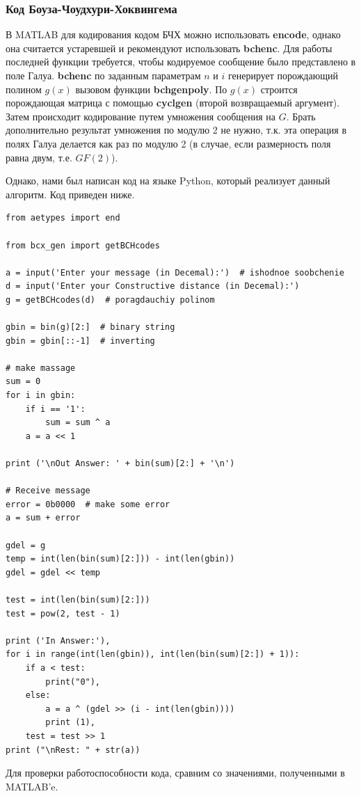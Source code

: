 \documentclass[12pt,a4paper]{article}
\begin{document}
\subsubsection{Код Боуза-Чоудхури-Хоквингема}
  
  В MATLAB для кодирования кодом БЧХ можно использовать \textbf{encode}, однако она считается устаревшей и рекомендуют использовать \textbf{bchenc}. Для работы последней функции требуется, чтобы кодируемое сообщение было представлено в поле Галуа.
  \textbf{bchenc} по заданным параметрам $n$ и $i$ генерирует порождающий полином $g(x)$ вызовом функции \textbf{bchgenpoly}. По $g(x)$ строится порождающая матрица с помощью \textbf{cyclgen} (второй возвращаемый аргумент). Затем происходит кодирование путем умножения сообщения на $G$. Брать дополнительно результат умножения по модулю 2 не нужно, т.к. эта операция в полях Галуа делается как раз по модулю 2 (в случае, если размерность поля равна двум, т.е. $GF(2)$).

Однако, нами был написан код на языке Python, который реализует данный алгоритм. Код приведен ниже.
\begin{lstlisting}
from aetypes import end

from bcx_gen import getBCHcodes

a = input('Enter your message (in Decemal):')  # ishodnoe soobchenie
d = input('Enter your Constructive distance (in Decemal):')
g = getBCHcodes(d)  # poragdauchiy polinom

gbin = bin(g)[2:]  # binary string
gbin = gbin[::-1]  # inverting

# make massage
sum = 0
for i in gbin:
    if i == '1':
        sum = sum ^ a
    a = a << 1

print ('\nOut Answer: ' + bin(sum)[2:] + '\n')

# Receive message
error = 0b0000  # make some error
a = sum + error

gdel = g
temp = int(len(bin(sum)[2:])) - int(len(gbin))
gdel = gdel << temp

test = int(len(bin(sum)[2:]))
test = pow(2, test - 1)

print ('In Answer:'),
for i in range(int(len(gbin)), int(len(bin(sum)[2:]) + 1)):
    if a < test:
        print("0"),
    else:
        a = a ^ (gdel >> (i - int(len(gbin))))
        print (1),
    test = test >> 1
print ("\nRest: " + str(a))
\end{lstlisting} 
  
Для проверки работоспособности кода, сравним со значениями, полученными в MATLAB'e.
\end{document}
